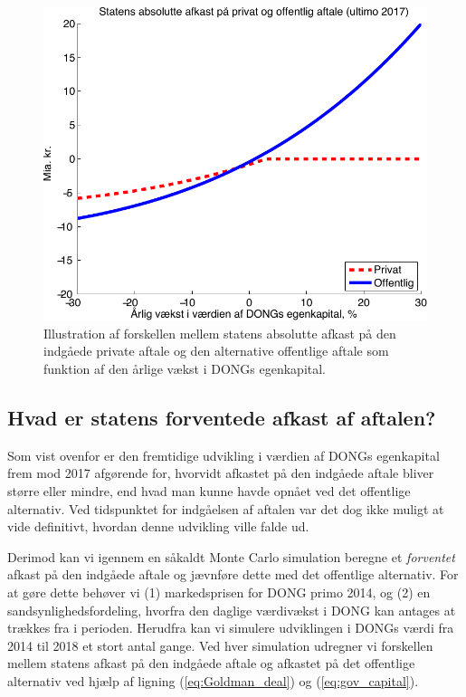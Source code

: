 \documentclass{article}
\begin{document}
\begin{figure}
\centerline{\includegraphics[scale=0.8, trim=0mm 0mm 0mm 0mm]{../matlab/figs/private_less_public_deal_guan.pdf}}
\caption{Illustration af forskellen mellem statens absolutte afkast p\aa{} den indg\aa{}ede private aftale og den alternative offentlige aftale som funktion af den \aa{}rlige v\ae{}kst i DONGs egenkapital. }
\label{fig:comp}
\end{figure}


\subsection{Hvad er statens forventede afkast af aftalen?}

Som vist ovenfor er den fremtidige udvikling i værdien af DONGs egenkapital frem mod 2017 afgørende for, hvorvidt afkastet på den indgåede aftale bliver større eller mindre, end hvad man kunne havde opnået ved det offentlige alternativ. Ved tidspunktet for indgåelsen af aftalen var det dog ikke muligt at vide definitivt, hvordan denne udvikling ville falde ud. 

Derimod kan vi igennem en såkaldt Monte Carlo simulation beregne et \emph{forventet} afkast på den indgåede aftale og jævnføre dette med det offentlige alternativ. For at gøre dette behøver vi (1) markedsprisen for DONG primo 2014, og (2) en sandsynlighedsfordeling, hvorfra den daglige værdivækst i DONG kan antages at trækkes fra i perioden. Herudfra kan vi simulere udviklingen i DONGs værdi fra 2014 til 2018 et stort antal gange. Ved hver simulation udregner vi forskellen mellem statens afkast på den indgåede aftale og afkastet på det offentlige alternativ ved hjælp af ligning (\ref{eq:Goldman_deal}) og (\ref{eq:gov_capital}).
\end{document}
